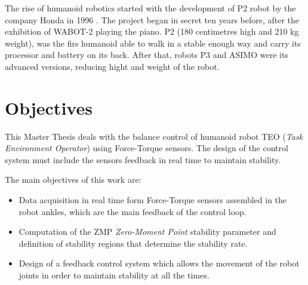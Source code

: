 The rise of humanoid robotics started with the development of P2 robot by the company Honda in 1996 \cite{Kaj}. The project began in secret ten years before, after the exhibition of WABOT-2 playing the piano. P2 (180 centimetres high and 210 kg weight), was the firs humanoid able to walk in a stable enough way and carry its processor and battery on its back. After that, robots P3 and ASIMO were its advanced versions, reducing hight and weight of the robot.


\section{Objectives}
This Master Thesis deals with the balance control of humanoid robot TEO (\textit{Task Environment Operator}) using Force-Torque sensors. The design of the control system must include the sensors feedback in real time to maintain stability.

The main objectives of this work are:
\begin{itemize}
\item Data acquisition in real time form Force-Torque sensors assembled in the robot ankles, which are the main feedback of the control loop.
\item Computation of the ZMP \textit{Zero-Moment Point} stability parameter and definition of stability regions that determine the stability rate.
\item Design of a feedback control system which allows the movement of the robot joints in order to maintain stability at all the times.
\end{itemize}


